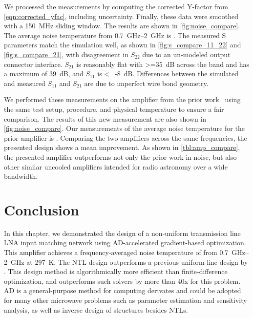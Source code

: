 We processed the measurements by computing the corrected Y-factor from \eqref{eqn:corrected_yfac}, including uncertainty.
Finally, these data were smoothed with a \qty{150}{\MHz} sliding window.
The results are shown in \autoref{fig:noise_compare}.
The average noise temperature from \qtyrange{0.7}{2}{\GHz} is \newnoise{}.
The measured S parameters match the simulation well, as shown in \autoref{fig:s_compare_11_22} and \autoref{fig:s_compare_21}, with disagreement in $S_{22}$ due to an un-modeled output connector interface.
$S_{21}$ is reasonably flat with \qty{>=35}{\dB} across the band and has a maximum of \qty{39}{\dB}, and $S_{11}$ is \qty{<=-8}{\dB}.
Differences between the simulated and measured $S_{11}$ and $S_{21}$ are due to imperfect wire bond geometry.

We performed these measurements on the amplifier from the prior work~\cite{shiRoomTemperatureLowNoiseAmplifier2023} using the same test setup, procedure, and physical temperature to ensure a fair comparison.
The results of this new measurement are also shown in \autoref{fig:noise_compare}.
Our measurements of the average noise temperature for the prior amplifier is \oldnoise.
Comparing the two amplifiers across the same frequencies, the presented design shows a \improvement mean improvement.
As shown in \autoref{tbl:amp_compare}, the presented amplifier outperforms not only the prior work in noise, but also other similar uncooled amplifiers intended for radio astronomy over a wide bandwidth.

\section{Conclusion}
In this chapter, we demonstrated the design of a non-uniform transmission line LNA input matching network using AD-accelerated gradient-based optimization.
This amplifier achieves a frequency-averaged noise temperature of \newnoise from \qtyrange{0.7}{2}{\GHz} at \qty{297}{\K}.
The NTL design outperforms a previous uniform-line design by \improvement.
This design method is algorithmically more efficient than finite-difference optimization, and outperforms such solvers by more than \num{40}x for this problem.
AD is a general-purpose method for computing derivates and could be adopted for many other microwave problems such as parameter estimation and sensitivity analysis, as well as inverse design of structures besides NTLs.

